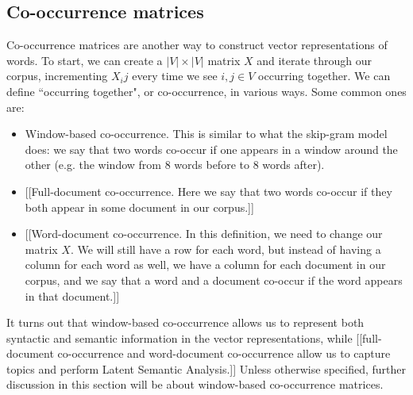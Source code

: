 \subsection{Co-occurrence matrices}
Co-occurrence matrices are another way to construct vector representations of words. To start, we can create a $|V| \times |V|$ matrix $X$ and iterate through our corpus, incrementing $X_ij$ every time we see $i, j \in V$ occurring together. We can define ``occurring together", or co-occurrence, in various ways. Some common ones are:
\begin{itemize}
\item Window-based co-occurrence. This is similar to what the skip-gram model does: we say that two words co-occur if one appears in a window around the other (e.g. the window from 8 words before to 8 words after).
\item {[[Full-document co-occurrence. Here we say that two words co-occur if they both appear in some document in our corpus.]]}
\item {[[Word-document co-occurrence. In this definition, we need to change our matrix $X$. We will still have a row for each word, but instead of having a column for each word as well, we have a column for each document in our corpus, and we say that a word and a document co-occur if the word appears in that document.]]}
\end{itemize}

It turns out that window-based co-occurrence allows us to represent both syntactic and semantic information in the vector representations, while [[full-document co-occurrence and word-document co-occurrence allow us to capture topics and perform Latent Semantic Analysis.]] Unless otherwise specified, further discussion in this section will be about window-based co-occurrence matrices.

